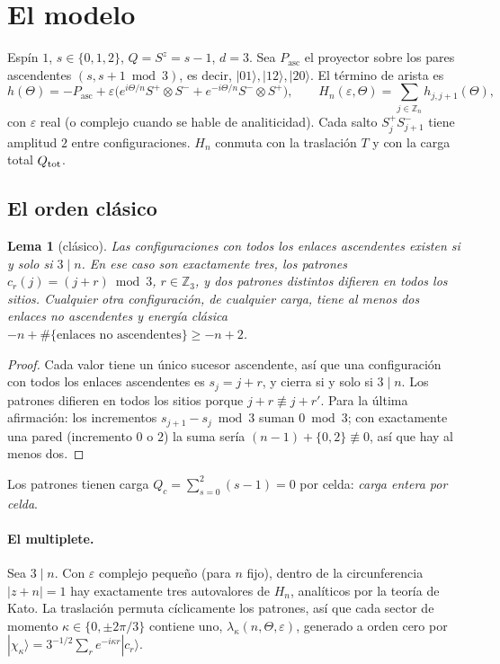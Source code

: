 \documentclass[11pt,a4paper]{article}
\newtheorem{lema}[teorema]{Lema}
\theoremstyle{definition}
\theoremstyle{remark}
\newcommand{\ket}[1]{|#1\rangle}
\newcommand{\Pasc}{P_{\mathrm{asc}}}
\newcommand{\eps}{\varepsilon}
\begin{document}
\section{El modelo}\label{sec:modelo}

Espín $1$, $s\in\{0,1,2\}$, $Q=S^z=s-1$, $d=3$. Sea $\Pasc$ el proyector sobre los pares ascendentes
$(s,s+1\bmod3)$, es decir, $\ket{01},\ket{12},\ket{20}$. El término de arista es
\begin{equation}\label{eq:h}
  h(\Theta)=-\Pasc+\eps\big(e^{i\Theta/n}S^+\otimes S^-+e^{-i\Theta/n}S^-\otimes S^+\big),
  \qquad H_n(\eps,\Theta)=\sum_{j\in\mathbb Z_n}h_{j,j+1}(\Theta),
\end{equation}
con $\eps$ real (o complejo cuando se hable de analiticidad). Cada salto $S^+_jS^-_{j+1}$ tiene amplitud
$2$ entre configuraciones. $H_n$ conmuta con la traslación $T$ y con la carga total $Q_{\rm tot}$.

\subsection{El orden clásico}

\begin{lema}[clásico]\label{lem:clasico}
Las configuraciones con todos los enlaces ascendentes existen si y solo si $3\mid n$. En ese caso son
exactamente tres, los \emph{patrones} $c_r(j)=(j+r)\bmod3$, $r\in\mathbb Z_3$, y dos patrones distintos
difieren en todos los sitios. Cualquier otra configuración, de cualquier carga, tiene al menos dos
enlaces no ascendentes y energía clásica $-n+\#\{\text{enlaces no ascendentes}\}\ge-n+2$.
\end{lema}

\begin{proof}
Cada valor tiene un único sucesor ascendente, así que una configuración con todos los enlaces
ascendentes es $s_j=j+r$, y cierra si y solo si $3\mid n$. Los patrones difieren en todos los sitios
porque $j+r\not\equiv j+r'$. Para la última afirmación: los incrementos $s_{j+1}-s_j\bmod 3$ suman
$0\bmod3$; con exactamente una pared (incremento $0$ o $2$) la suma sería $(n-1)+\{0,2\}\not\equiv0$,
así que hay al menos dos.
\end{proof}

Los patrones tienen carga $Q_c=\sum_{s=0}^2(s-1)=0$ por celda: \emph{carga entera por celda}.

\paragraph{El multiplete.} Sea $3\mid n$. Con $\eps$ complejo pequeño (para $n$ fijo), dentro de la
circunferencia $|z+n|=1$ hay exactamente tres autovalores de $H_n$, analíticos por la teoría de Kato. La
traslación permuta cíclicamente los patrones, así que cada sector de momento
$\kappa\in\{0,\pm2\pi/3\}$ contiene uno, $\lambda_\kappa(n,\Theta,\eps)$, generado a orden cero por
$\ket{\chi_\kappa}=3^{-1/2}\sum_r e^{-i\kappa r}\ket{c_r}$.
\end{document}
